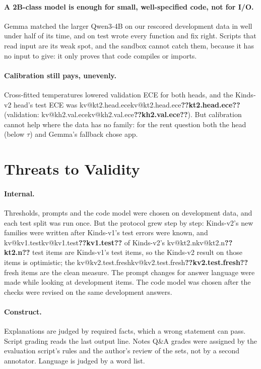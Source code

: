 \documentclass[11pt,a4paper]{article}
\makeatletter
\DeclareRobustCommand{\kv}[1]{\ifcsname kv@#1\endcsname\csname kv@#1\endcsname\else\textbf{??#1??}\fi}
\makeatother
\begin{document}
\paragraph{A 2B-class model is enough for small, well-specified code, not for I/O.} Gemma matched the larger Qwen3-4B
on our rescored development data in well under half of its time, and on test wrote every function and fix right. Scripts that
read input are its weak spot, and the sandbox cannot catch them, because it has no input to give: it only proves that
code compiles or imports.

\paragraph{Calibration still pays, unevenly.} Cross-fitted temperatures lowered validation ECE for both heads, and the
Kinds-v2 head's test ECE was \kv{kt2.head.ece} (validation: \kv{kh2.val.ece}). But calibration cannot help where the data has no
family: for the rent question both the head (below $\tau$) and Gemma's fallback chose app.

\section{Threats to Validity}\label{sec:threats}

\paragraph{Internal.} Thresholds, prompts and the code model were chosen on development data, and each test split was
run once. But the protocol grew step by step: Kinds-v2's new families were written after Kinds-v1's test errors were
known, and \kv{kv1.test} of Kinds-v2's \kv{kt2.n} test items are Kinds-v1's test items, so the Kinds-v2 result on those
items is optimistic; the \kv{kv2.test.fresh} fresh items are the clean measure. The prompt changes for answer language
were made while looking at development items. The code model was chosen after the checks were revised on the same
development answers.

\paragraph{Construct.} Explanations are judged by required facts, which a wrong statement can pass. Script grading
reads the last output line. Notes Q\&A grades were assigned by the evaluation script's rules and the author's review
of the sets, not by a second annotator. Language is judged by a word list.
\end{document}

